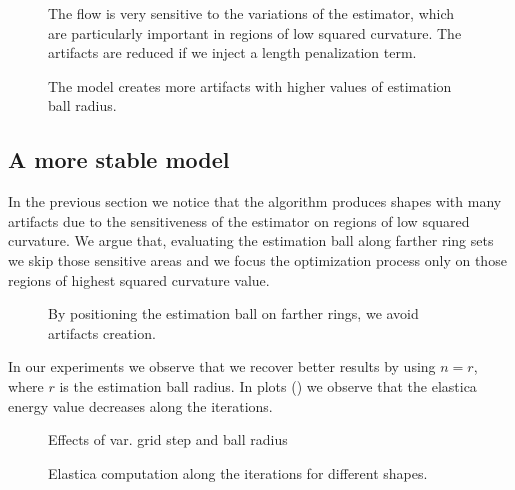 \documentclass[runningheads]{llncs}
\begin{document}
\begin{figure}[!ht]
\caption{The flow is very sensitive to the variations of the estimator, which are particularly important in regions of low squared curvature. The artifacts are reduced if we inject a length penalization term. }
\label{fig:m1-square-flow}
\end{figure}



\begin{figure}[!ht]
\caption{The model creates more artifacts with higher values of estimation ball radius. }
\label{fig:m1-higher-ball-radius}
\end{figure}


\subsection{A more stable model}

In the previous section we notice that the algorithm produces shapes with many artifacts due to the sensitiveness of the estimator on regions of low squared curvature. We argue that, evaluating the estimation ball along farther ring sets we skip those sensitive areas and we focus the optimization process only on those regions of highest squared curvature value. 



\begin{figure}[!ht]
\label{fig:mx-square-flow}
\caption{By positioning the estimation ball on farther rings, we avoid artifacts creation. }
\end{figure}

In our experiments we observe that we recover better results by using $n=r$, where $r$ is the estimation ball radius. In plots () we observe that the elastica energy value decreases along the iterations.


\begin{figure}[!ht]
\label{fig:mx-flow-gs-radius-effect}
\caption{Effects of var. grid step and ball radius}
\end{figure}

\begin{figure}[!ht]
\label{gif:mx-elastica-plots}
\caption{Elastica computation along the iterations for different shapes. }
\end{figure}
\end{document}
